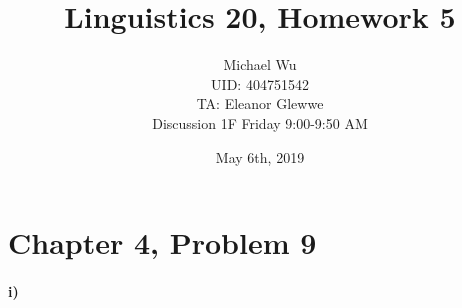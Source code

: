 \documentclass[12pt]{article}
\begin{document}
\title{Linguistics 20, Homework 5}
\date{May 6th, 2019}
\author{Michael Wu\\UID: 404751542\\TA: Eleanor Glewwe\\Discussion 1F Friday 9:00-9:50 AM}
\maketitle

\section*{Chapter 4, Problem 9}

\paragraph{i)}
\end{document}
